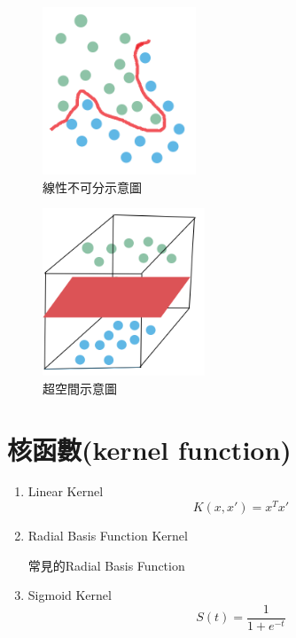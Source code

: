 \begin{figure}[H]
	\centerline{\includegraphics[height=5cm]{pic/unlinear.PNG}}
	\caption{線性不可分示意圖}
	\label{fig:unkinear}
\end{figure}

\begin{figure}[H]
	\centerline{\includegraphics[height=5cm]{pic/over space.PNG}}
	\caption{超空間示意圖}
	\label{fig:overspace}
\end{figure}
\label{sec:background}

\section{核函數(kernel function)}
\begin{enumerate}
	\item
	      Linear Kernel
	      \begin{equation}
		      \label{Linear Kerne}
		      K(x,x')=x^Tx'
	      \end{equation}

	\item
	      Radial Basis Function Kernel
	      \begin{table}[h!]
		      \centering
		      \label{tab:rbf_table}
		      
		      \caption{常見的Radial Basis Function}
	      \end{table}
	\item
	      Sigmoid Kernel
	      \begin{equation}
		      \label{Sigmoid Kerne}
		      S(t)=\frac{1}{1+e^{-t}}
	      \end{equation}


\end{enumerate}

